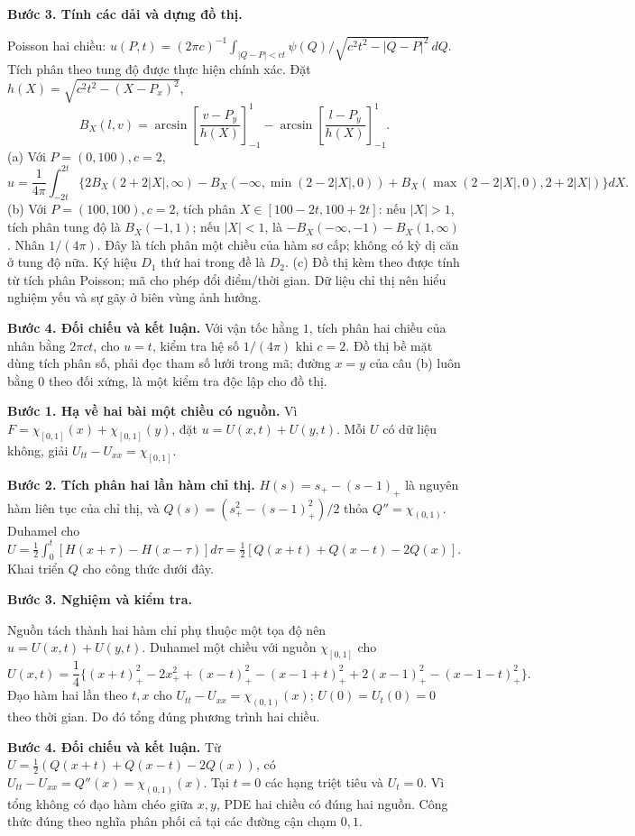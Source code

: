 \textbf{Bước 3. Tính các dải và dựng đồ thị.}

Poisson hai chiều: $u(P,t)=(2\pi c)^{-1}\int_{|Q-P|<ct}\psi(Q)/\sqrt{c^2t^2-|Q-P|^2}\,dQ$. Tích phân theo tung độ được thực hiện chính xác. Đặt $h(X)=\sqrt{c^2t^2-(X-P_x)^2}$,
\[B_X(l,v)=\arcsin\left[\frac{v-P_y}{h(X)}\right]_{-1}^1-\arcsin\left[\frac{l-P_y}{h(X)}\right]_{-1}^1.\]
(a) Với $P=(0,100),c=2$,
\[u=\frac1{4\pi}\int_{-2t}^{2t}\{2B_X(2+2|X|,\infty)-B_X(-\infty,\min(2-2|X|,0))+B_X(\max(2-2|X|,0),2+2|X|)\}dX.\]
(b) Với $P=(100,100),c=2$, tích phân $X\in[100-2t,100+2t]$: nếu $|X|>1$, tích phân tung độ là $B_X(-1,1)$; nếu $|X|<1$, là $-B_X(-\infty,-1)-B_X(1,\infty)$. Nhân $1/(4\pi)$. Đây là tích phân một chiều của hàm sơ cấp; không có kỳ dị căn ở tung độ nữa. Ký hiệu $D_1$ thứ hai trong đề là $D_2$.
(c) Đồ thị kèm theo được tính từ tích phân Poisson; mã cho phép đổi điểm/thời gian. Dữ liệu chỉ thị nên hiểu nghiệm yếu và sự gãy ở biên vùng ảnh hưởng.

\textbf{Bước 4. Đối chiếu và kết luận.} Với vận tốc hằng $1$, tích phân hai chiều của nhân bằng $2\pi ct$, cho $u=t$, kiểm tra hệ số $1/(4\pi)$ khi $c=2$. Đồ thị bề mặt dùng tích phân số, phải đọc tham số lưới trong mã; đường $x=y$ của câu (b) luôn bằng $0$ theo đối xứng, là một kiểm tra độc lập cho đồ thị.

\textbf{Bước 1. Hạ về hai bài một chiều có nguồn.} Vì $F=\chi_{[0,1]}(x)+\chi_{[0,1]}(y)$, đặt $u=U(x,t)+U(y,t)$. Mỗi $U$ có dữ liệu không, giải $U_{tt}-U_{xx}=\chi_{[0,1]}$.

\textbf{Bước 2. Tích phân hai lần hàm chỉ thị.} $H(s)=s_+-(s-1)_+$ là nguyên hàm liên tục của chỉ thị, và $Q(s)=(s_+^2-(s-1)_+^2)/2$ thỏa $Q''=\chi_{(0,1)}$. Duhamel cho $U=\frac12\int_0^t[H(x+\tau)-H(x-\tau)]d\tau=\frac12[Q(x+t)+Q(x-t)-2Q(x)]$. Khai triển $Q$ cho công thức dưới đây.

\textbf{Bước 3. Nghiệm và kiểm tra.}

Nguồn tách thành hai hàm chỉ phụ thuộc một tọa độ nên $u=U(x,t)+U(y,t)$. Duhamel một chiều với nguồn $\chi_{[0,1]}$ cho
\[U(x,t)=\frac14\{(x+t)_+^2-2x_+^2+(x-t)_+^2-(x-1+t)_+^2+2(x-1)_+^2-(x-1-t)_+^2\}.\]
Đạo hàm hai lần theo $t,x$ cho $U_{tt}-U_{xx}=\chi_{(0,1)}(x)$; $U(0)=U_t(0)=0$ theo thời gian. Do đó tổng đúng phương trình hai chiều.

\textbf{Bước 4. Đối chiếu và kết luận.} Từ $U=\frac12(Q(x+t)+Q(x-t)-2Q(x))$, có $U_{tt}-U_{xx}=Q''(x)=\chi_{(0,1)}(x)$. Tại $t=0$ các hạng triệt tiêu và $U_t=0$. Vì tổng không có đạo hàm chéo giữa $x,y$, PDE hai chiều có đúng hai nguồn. Công thức đúng theo nghĩa phân phối cả tại các đường cận chạm $0,1$.

